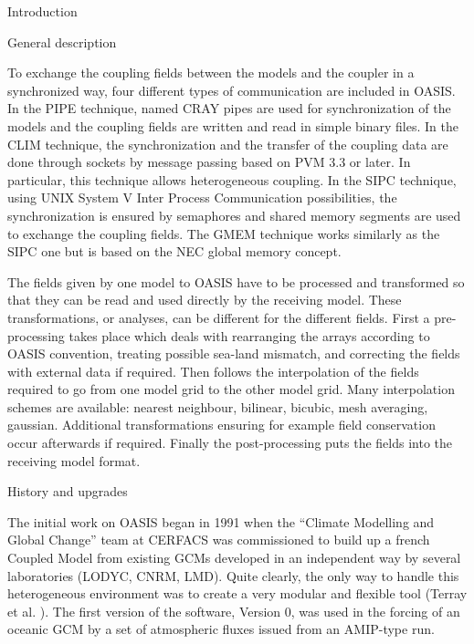 \begin{section}{Introduction}
\begin{subsection}{General description}
\vspace{0.4cm}

To exchange the coupling fields between the models and the coupler in a
synchronized way, four
different types of communication are included in OASIS. In the PIPE technique, 
named CRAY pipes are used for synchronization of the models and the coupling 
fields
are written and read in simple binary files. In the CLIM technique, the 
synchronization and the transfer of the coupling data are done through 
sockets by
message passing based on PVM 3.3 or later. In particular, this technique 
allows 
heterogeneous coupling. In the SIPC technique, using UNIX System V Inter Process
Communication possibilities, 
the synchronization is ensured by semaphores and shared memory segments are
used to exchange the coupling fields. The GMEM technique works similarly
as the SIPC one but is based on the NEC global memory concept.

\vspace{0.4cm}

The fields given by one model to OASIS have to be processed and transformed so 
that they can be read and used directly by the receiving model. These
transformations, or analyses, can be different for the different fields.
First a pre-processing takes place which deals with rearranging the arrays
according to OASIS convention, treating possible sea-land mismatch, and 
correcting the fields with external data if required. Then follows the 
interpolation of the fields required to go from one model grid to the other 
model grid. Many interpolation schemes are available: nearest neighbour,
bilinear, bicubic, mesh averaging, gaussian. Additional transformations
ensuring for example field conservation occur afterwards if required. Finally 
the post-processing puts the fields into the receiving model format.

\end{subsection}

\begin{subsection}{History and upgrades}

The initial work on OASIS began in 1991 when the ``Climate Modelling
and Global Change'' team at CERFACS was commissioned to build up a
french Coupled Model from existing GCMs developed in an independent way by 
several laboratories (LODYC, CNRM, LMD). Quite clearly, the only way 
to handle this heterogeneous
environment was to create a very modular and flexible tool
(Terray et al. \cite{meteo}).
The first version of the software, Version 0, was used in the forcing
of an oceanic GCM by a set of atmospheric fluxes issued from
an AMIP-type run.


\end{subsection}
\end{section}
